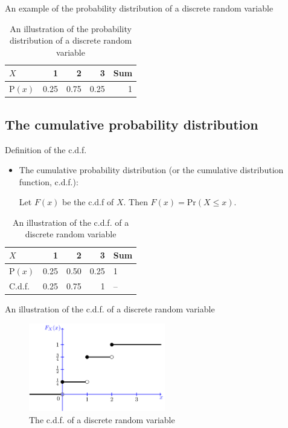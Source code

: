 \documentclass[presentation]{beamer}
\begin{document}
\begin{frame}[label={sec:org37bba7d}]{An example of the probability distribution of a discrete random variable}
\begin{table}[htbp]
\caption{\label{tab:org388079b}
An illustration of the probability distribution of a discrete random variable}
\centering
\begin{tabular}{lrrrr}
\toprule
\(X\) & 1 & 2 & 3 & Sum\\
\midrule
\(\mathrm{P}(x)\) & 0.25 & 0.75 & 0.25 & 1\\
\bottomrule
\end{tabular}
\end{table}
\end{frame}

\subsection*{The cumulative probability distribution}
\label{sec:org5d18725}

\begin{frame}[label={sec:org1d8bd9b}]{Definition of the c.d.f.}
\begin{itemize}
\item The \alert{cumulative probability distribution} (or the cumulative
distribution function, c.d.f.): 

Let \(F(x)\) be the c.d.f of \(X\). Then \(F(x) = \mathrm{Pr}(X \leq x)\).
\end{itemize}

\begin{table}[htbp]
\caption{\label{tab:orgbe2a6a9}
An illustration of the c.d.f. of a discrete random variable}
\centering
\begin{tabular}{lrrrl}
\toprule
\(X\) & 1 & 2 & 3 & Sum\\
\midrule
\(\mathrm{P}(x)\) & 0.25 & 0.50 & 0.25 & 1\\
C.d.f. & 0.25 & 0.75 & 1 & --\\
\bottomrule
\end{tabular}
\end{table}
\end{frame}

\begin{frame}[label={sec:orge67a82a}]{An illustration of the c.d.f. of a discrete random variable}
\begin{figure}[htbp]
\centering
\includegraphics[width=0.53\textwidth,height=0.45\textheight]{figure/cdf_discrete_example.png}
\caption{\label{fig:orgbc500e5}
The c.d.f. of a discrete random variable}
\end{figure}
\end{frame}
\end{document}
